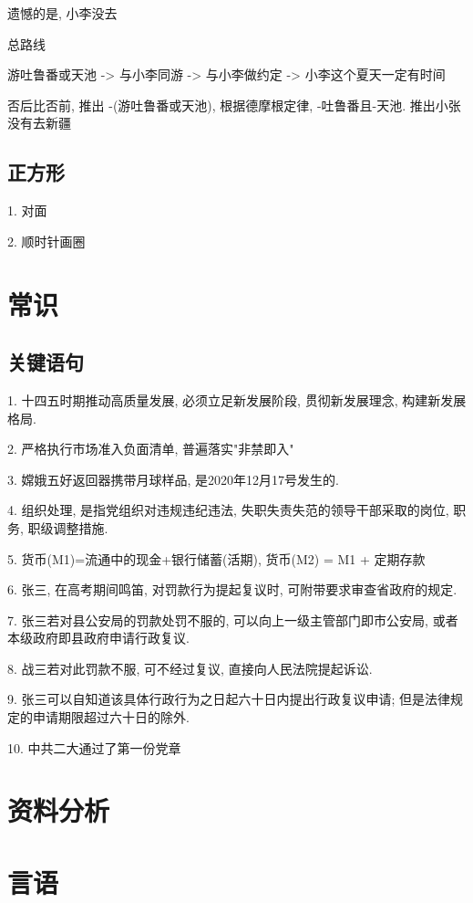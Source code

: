 \documentclass[UTF8]{ctexart}
\begin{document}
遗憾的是, 小李没去

总路线

游吐鲁番或天池 -> 与小李同游 -> 与小李做约定 -> 小李这个夏天一定有时间

否后比否前, 推出 -(游吐鲁番或天池), 根据德摩根定律, -吐鲁番且-天池. 推出小张没有去新疆

\subsection{正方形}

1. 对面

2. 顺时针画圈

\section{常识}

\subsection{关键语句}

1. 十四五时期推动高质量发展, 必须立足新发展阶段, 贯彻新发展理念, 构建新发展格局.

2. 严格执行市场准入负面清单, 普遍落实"非禁即入"

3. 嫦娥五好返回器携带月球样品, 是2020年12月17号发生的.

4. 组织处理, 是指党组织对违规违纪违法, 失职失责失范的领导干部采取的岗位, 职务, 职级调整措施.

5. 货币(M1)=流通中的现金+银行储蓄(活期), 货币(M2) = M1 + 定期存款

6. 张三, 在高考期间鸣笛, 对罚款行为提起复议时, 可附带要求审查省政府的规定.

7. 张三若对县公安局的罚款处罚不服的, 可以向上一级主管部门即市公安局, 或者本级政府即县政府申请行政复议.

8. 战三若对此罚款不服, 可不经过复议, 直接向人民法院提起诉讼.

9. 张三可以自知道该具体行政行为之日起六十日内提出行政复议申请; 但是法律规定的申请期限超过六十日的除外.

10. 中共二大通过了第一份党章



\section{资料分析}

\section{言语}
\end{document}
